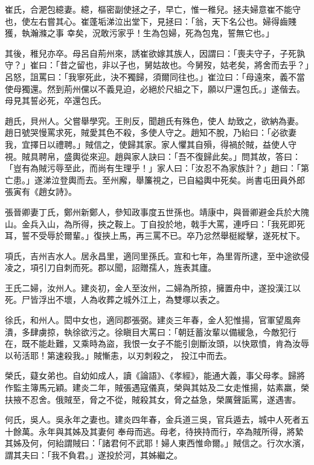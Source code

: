 \begin{pinyinscope}
 崔氏，合淝包繶妻。繶，樞密副使拯之子，早亡，惟一稚兒。拯夫婦意崔不能守也，使左右嘗其心。崔蓬垢涕泣出堂下，見拯曰：「翁，天下名公也。婦得齒賤獲，執瀚滌之事
 幸矣，況敢污家乎！生為包婦，死為包鬼，誓無它也。」



 其後，稚兒亦卒。母呂自荊州來，誘崔欲嫁其族人，因謂曰：「喪夫守子，子死孰守？」崔曰：「昔之留也，非以子也，舅姑故也。今舅歿，姑老矣，將舍而去乎？」呂怒，詛罵曰：「我寧死此，決不獨歸，須爾同往也。」崔泣曰：「母遠來，義不當使母獨還。然到荊州儻以不義見迫，必絕於尺組之下，願以尸還包氏。」遂偕去。母見其誓必死，卒還包氏。



 趙氏，貝州人。父嘗舉學究。王則反，聞趙氏有殊色，使人
 劫致之，欲納為妻。趙日號哭慢罵求死，賊愛其色不殺，多使人守之。趙知不脫，乃紿曰：「必欲妻我，宜擇日以禮聘。」賊信之，使歸其家。家人懼其自殞，得禍於賊，益使人守視。賊具聘帛，盛輿從來迎。趙與家人訣曰：「吾不復歸此矣。」問其故，答曰：「豈有為賊污辱至此，而尚有生理乎！」家人曰：「汝忍不為家族計？」趙曰：「第亡患。」遂涕泣登輿而去。至州廨，舉簾視之，已自縊輿中死矣。尚書屯田員外郎張寅有《趙女詩》。



 張晉卿妻丁氏，鄭州新鄭人，參知政事度五世孫也。靖康中，與晉卿避金兵於大隗山。金兵入山，為所得，挾之鞍上。丁自投於地，戟手大罵，連呼曰：「我死即死耳，誓不受辱於爾輩。」復挾上馬，再三罵不已。卒乃忿然舉梃縱擊，遂死杖下。



 項氏，吉州吉水人。居永昌里，適同里孫氏。宣和七年，為里胥所逮，至中途欲侵凌之，項引刀自刺而死。郡以聞，詔贈孺人，旌表其廬。



 王氏二婦，汝州人。建炎初，金人至汝州，二婦為所掠，擁置舟中，遂投漢江以死。尸皆浮出不壞，人為收葬之城外江上，為雙塚以表之。



 徐氏，和州人。閎中女也，適同郡張弼。建炎三年春，金人犯惟揚，官軍望風奔潰，多肆虜掠，執徐欲污之。徐瞋目大罵曰：「朝廷蓄汝輩以備緩急，今敵犯行在，既不能赴難，又乘時為盜，我恨一女子不能引劍斷汝頭，以快眾憤，肯為汝辱以茍活耶！第速殺我。」賊慚恚，以刃刺殺之，
 投江中而去。



 榮氏，薿女弟也。自幼如成人，讀《論語》、《孝經》，能通大義，事父母孝。歸將作監主簿馬元穎。建炎二年，賊張遇寇儀真，榮與其姑及二女走惟揚，姑素羸，榮扶掖不忍舍。俄賊至，脅之不從，賊殺其女，脅之益急，榮厲聲詬罵，遂遇害。



 何氏，吳人。吳永年之妻也。建炎四年春，金兵道三吳，官兵遁去，城中人死者五十餘萬。永年與其姊及其妻何
 奉母而逃。母老，待挾持而行，卒為賊所得，將縶其姊及何，何紿謂賊曰：「諸君何不武耶！婦人東西惟命爾。」賊信之。行次水濱，謂其夫曰：「我不負君。」遂投於河，其姊繼之。




\end{pinyinscope}
